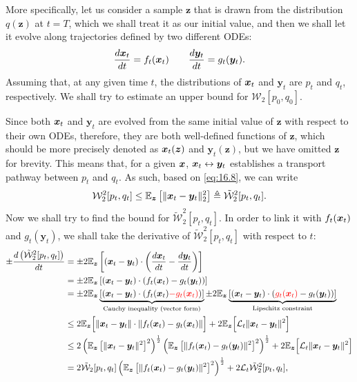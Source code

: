 More specifically, let us consider a sample $\bm{z}$ that is drawn from the distribution $q(\bm{z})$ at $t=T$, which we shall treat it as our initial value, and then we shall let it evolve along trajectories defined by two different ODEs:
\begin{equation}
    \label{eq:16.11}
    \frac{d\bm{x}_{t}}{dt}=f_t(\bm{x}_{t})\qquad \frac{d\bm{y}_t}{dt}=g_t(\bm{y}_t).
\end{equation}
Assuming that, at any given time $t$, the distributions of $\bm{x}_{t}$ and $\bm{y}_t$ are $p_t$ and $q_t$, respectively. We shall try to estimate an upper bound for $\mathcal{W}_2[p_0,q_0]$.

Since both $\bm{x}_{t}$ and $\bm{y}_t$ are evolved from the same initial value of $\bm{z}$ with respect to their own ODEs, therefore, they are both well-defined functions of $\bm{z}$, which should be more precisely denoted as $\bm{x}_{t}(\bm{z})$ and $\bm{y}_t(\bm{z})$, but we have omitted $\bm{z}$ for brevity. This means that, for a given $\bm{x}$, $\bm{x}_{t}\leftrightarrow\bm{y}_t$ establishes a transport pathway between $p_t$ and $q_t$. As such, based on \cref{eq:16.8}, we can write
\begin{equation}
\label{eq:16.12}
    \mathcal{W}_2^2[p_t,q_t]\leq \mathbb{E}_{\bm{z}}\left[\|\bm{x}_{t}-\bm{y}_t\|_2^2 \right]\triangleq \tilde{\mathcal{W}}_2^2[p_t,q_t].
\end{equation}
Now we shall try to find the bound for $\tilde{\mathcal{W}}_2^2[p_t,q_t]$. In order to link it with $f_t(\bm{x}_{t})$ and $g_t(\bm{y}_t)$, we shall take the derivative of $\tilde{\mathcal{W}}_2^2[p_t,q_t]$ with respect to $t$:
\begin{align}
\pm\frac{d\left(\tilde{\mathcal{W}}_2^2[p_t,q_t]\right)}{dt}&=\pm 2\mathbb{E}_{\bm{z}}\left[(\bm{x}_{t}-\bm{y}_t)\cdot\left(\frac{d\bm{x}_{t}}{dt}-\frac{d\bm{y}_t}{dt}\right)\right]\nonumber\\
    &=\pm 2\mathbb{E}_{\bm{z}}\left[(\bm{x}_{t}-\bm{y}_t)\cdot\left( f_t(\bm{x}_{t})-g_t(\bm{y}_t)\right) \right]\nonumber\\
    &= \pm 2\mathbb{E}_{\bm{z}}\underbrace{\left[(\bm{x}_{t}-\bm{y}_t)\cdot\left( f_t(\bm{x}_{t})\textcolor{red}{-g_t(\bm{x}_{t})}\right)\right]}_{\mbox{\scriptsize{Cauchy inequality (vector form)}}} \pm 2\mathbb{E}_{\bm{z}}\underbrace{\left[(\bm{x}_{t}-\bm{y}_t)\cdot\left( \textcolor{red}{g_t(\bm{x}_{t})}-g_t(\bm{y}_t)\right)\right]}_{\mbox{\scriptsize{Lipschitz constraint}}}\nonumber\\
    &\leq  2\mathbb{E}_{\bm{z}}\Bigl[\|\bm{x}_{t}-\bm{y}_t\|\cdot \|f_t(\bm{x}_{t})-g_t(\bm{x}_{t})\| \Bigr] + 2\mathbb{E}_{\bm{z}} \Bigl[\mathcal{L}_t \|\bm{x}_{t}-\bm{y}_t\|^2 \Bigr] \label{eq:16.13}\\
    &\leq 2 \left(\mathbb{E}_{\bm{z}}\left[ \|\bm{x}_t-\bm{y}_t\|^2\right]^2 \right)^{\frac{1}{2}}\left(\mathbb{E}_{\bm{z}}\left[ \|f_t(\bm{x}_t)-g_t(\bm{y}_t)\|^2\right]^2 \right)^{\frac{1}{2}} + 2\mathbb{E}_{\bm{z}} \Bigl[\mathcal{L}_t \|\bm{x}_{t}-\bm{y}_t\|^2 \Bigr]\nonumber\\
    &=2\tilde{\mathcal{W}}_2[p_t,q_t]\left(\mathbb{E}_{\bm{z}}\left[ \|f_t(\bm{x}_t)-g_t(\bm{y}_t)\|^2\right]^2 \right)^{\frac{1}{2}} +2\mathcal{L}_t\tilde{\mathcal{W}}_2^2[p_t,q_t],\nonumber
\end{align}
